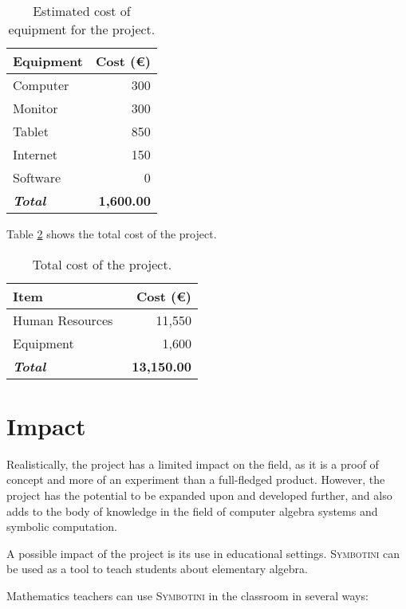 \begin{table}[H]
    \begin{tabular}{l r}
        \hline
        \textbf{Equipment} & \textbf{Cost (€)} \\
        \hline
        Computer & 300 \\
        Monitor & 300 \\
        Tablet & 850 \\
        Internet & 150 \\
        Software & 0 \\
        \hline
        \textbf{\textit{Total}} & \textbf{1,600.00} \\
        \hline
    \end{tabular}
    \caption{Estimated cost of equipment for the project.}
    \label{tab:equipment}
\end{table}

Table \ref{tab:total-cost} shows the total cost of the project.

\begin{table}[H]
    \begin{tabular}{l r}
        \hline
        \textbf{Item} & \textbf{Cost (€)} \\
        \hline
        Human Resources & 11,550 \\
        Equipment & 1,600 \\
        \hline
        \textbf{\textit{Total}} & \
        \textbf{13,150.00} \\
        \hline
    \end{tabular}
    \caption{Total cost of the project.}
    \label{tab:total-cost}
\end{table}

\section{Impact}\label{sec:impact}

Realistically, the project has a limited impact on the field, as it is a proof of concept and more of an experiment than a full-fledged product. However, the project has the potential to be expanded upon and developed further, and also adds to the body of knowledge in the field of computer algebra systems and symbolic computation.

A possible impact of the project is its use in educational settings. \textsc{Symbotini} can be used as a tool to teach students about elementary algebra.

Mathematics teachers can use \textsc{Symbotini} in the classroom in several ways:


